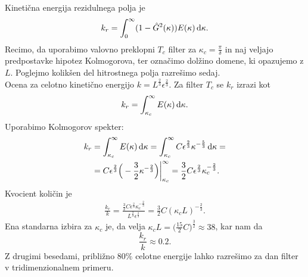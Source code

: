 \documentclass[mat2, tisk]{fmfdelo}
\begin{document}
\begin{primer}
Kinetična energija rezidulnega polja je 
$$
k_r = \int_{0}^{\infty} (1 - \hat{G}^2(\kappa)) E(\kappa) \dif \kappa.
$$
Recimo, da uporabimo valovno preklopni $T_c$ filter za $\kappa_c = \frac{\pi}{\delta}$ in naj veljajo
predpostavke hipotez Kolmogorova, ter označimo dolžino domene, ki opazujemo z $L$. 
Poglejmo kolikšen del hitrostnega polja razrešimo sedaj. \\

Ocena za celotno kinetično energijo $k = L^\frac{2}{3} \epsilon^\frac{2}{3}$. 
Za filter $T_c$ se $k_r$ izrazi kot 
$$
k_r = \int_{\kappa_c}^{\infty} E(\kappa) \dif \kappa. 
$$
Uporabimo Kolmogorov spekter: 
\begin{align*}
k_r &= \int_{\kappa_c}^{\infty} E(\kappa) \dif \kappa = \int_{\kappa_c}^{\infty} C \epsilon^{\frac{2}{3}} \kappa^{-\frac{5}{3}} \dif \kappa = \\
&= C \epsilon^{\frac{2}{3}} \Big(- \frac{3}{2} \kappa^{-\frac{2}{3}}\Big)\Big|_{\kappa_c}^\infty = \frac{3}{2} C \epsilon^{\frac{2}{3}}\kappa_c^{-\frac{2}{3}}.
\end{align*}
Kvocient količin je 
\begin{align*}
\frac{k_r}{k} = \frac{\frac{3}{2} C \epsilon^{\frac{2}{3}}\kappa_c^{-\frac{2}{3}}}{L^\frac{2}{3} \epsilon^\frac{2}{3}} = 
\frac{3}{2}C (\kappa_c L)^{-\frac{2}{3}}.
\end{align*}
Ena standarna izbira za $\kappa_c$ je, da velja $\kappa_c L = \Big(\frac{15}{2}C\Big)^\frac{3}{2} \approx 38$, 
kar nam da 
$$
\frac{k_r}{k} \approx 0.2.
$$
Z drugimi besedami, približno $80\%$ celotne energije lahko razrešimo 
za dan filter v tridimenzionalnem primeru.
\end{primer}

\newpage
\end{document}
